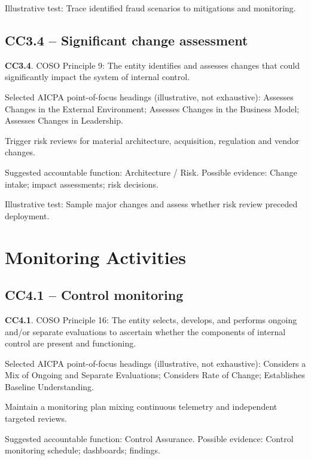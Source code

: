 \documentclass[10pt,oneside]{report}
\begin{document}
Illustrative test: Trace identified fraud scenarios to mitigations and monitoring.

\subsection*{CC3.4 -- Significant change assessment}
\begin{aicpabox}
\textbf{CC3.4}. COSO Principle 9: The entity identifies and assesses changes that could significantly impact the system of internal control.\par{}
\end{aicpabox}
Selected AICPA point-of-focus headings (illustrative, not exhaustive): Assesses Changes in the External Environment; Assesses Changes in the Business Model; Assesses Changes in Leadership.

\begin{engineeringbox}
Trigger risk reviews for material architecture, acquisition, regulation and vendor changes.
\end{engineeringbox}
Suggested accountable function: Architecture / Risk. Possible evidence: Change intake; impact assessments; risk decisions.

Illustrative test: Sample major changes and assess whether risk review preceded deployment.

\section{Monitoring Activities}
\subsection*{CC4.1 -- Control monitoring}
\begin{aicpabox}
\textbf{CC4.1}. COSO Principle 16: The entity selects, develops, and performs ongoing and/or separate evaluations to ascertain whether the components of internal control are present and functioning.\par{}
\end{aicpabox}
Selected AICPA point-of-focus headings (illustrative, not exhaustive): Considers a Mix of Ongoing and Separate Evaluations; Considers Rate of Change; Establishes Baseline Understanding.

\begin{engineeringbox}
Maintain a monitoring plan mixing continuous telemetry and independent targeted reviews.
\end{engineeringbox}
Suggested accountable function: Control Assurance. Possible evidence: Control monitoring schedule; dashboards; findings.
\end{document}
